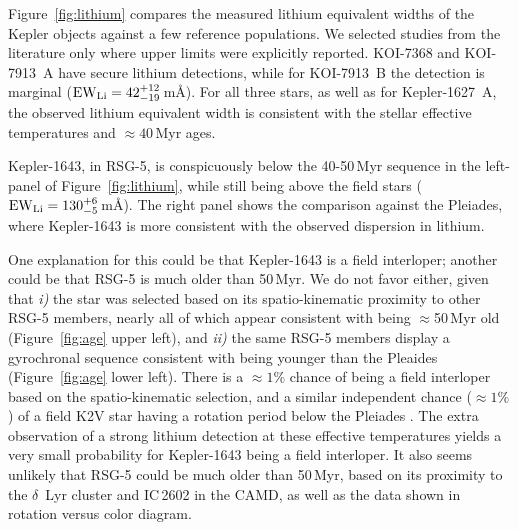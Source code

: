 \documentclass[12pt,twocolumn]{aastex63}
\begin{document}
Figure~\ref{fig:lithium} compares the measured lithium equivalent
widths of the Kepler objects against a few reference populations.  We
selected studies from the literature only where upper limits were
explicitly reported.  KOI-7368 and KOI-7913~A have secure lithium
detections, while for KOI-7913~B the detection is marginal (${\rm EW}_{\rm
Li} = 42^{+12}_{-19}$\,m\AA).  For all three stars, as well as for
Kepler-1627~A, the observed lithium equivalent width is consistent
with the stellar effective temperatures and $\approx40$\,Myr ages.

Kepler-1643, in RSG-5, is conspicuously below the 40-50$\,$Myr
sequence in the left-panel of Figure~\ref{fig:lithium}, while still
being above the field stars (${\rm EW}_{\rm Li} = 130^{+6}_{-5}$\,m\AA).
The right panel shows the comparison against the Pleiades, where
Kepler-1643 is more consistent with the observed dispersion in
lithium.

One explanation for this could be that Kepler-1643 is a field
interloper; another could be that RSG-5 is much older than 50\,Myr.  We do
not favor either, given that {\it i)} the star was selected based
on its spatio-kinematic proximity to other RSG-5 members, nearly all
of which appear consistent with being $\approx$50\,Myr old
(Figure~\ref{fig:age} upper left), and {\it ii)} the same RSG-5
members display a gyrochronal sequence consistent with being younger
than the Pleaides (Figure~\ref{fig:age} lower left).  
There is a $\approx$$1\%$ chance of being a field interloper based on
the spatio-kinematic selection, and a similar independent chance
($\approx$$1\%$) of a field K2V star having a rotation period below the
Pleiades \citep{mcquillan_rotation_2014}.
The extra observation of a strong lithium detection at these
effective temperatures yields a very small probability for Kepler-1643 
being a field interloper.
It also seems unlikely that RSG-5 could be much older than 50\,Myr,
based on its proximity to the $\delta$~Lyr cluster and IC\,2602 in the
CAMD, as well as the data shown in rotation versus color diagram.
\end{document}
